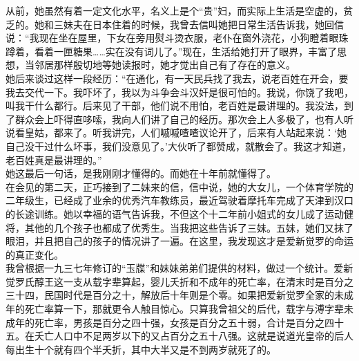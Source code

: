 从前，她虽然有着一定文化水平，名义上是个“贵”妇，而实际上生活是空虚的，贫乏的。她和三妹夫在日本住着的时候，我曾去信叫她把日常生活告诉我，她回信说：“我现在坐在屋里，下女在旁用熨斗烫衣服，老仆在窗外浇花，小狗瞪着眼珠蹲着，看着一匣糖果……实在没有词儿了。”现在，生活给她打开了眼界，丰富了思想，当邻居那样殷切地等她读报时，她才觉出自己有了存在的意义。\\

她后来谈过这样一段经历：“在通化，有一天民兵找了我去，说老百姓在开会，要我去交代一下。我吓坏了，我以为斗争会斗汉奸是很可怕的。我说，你饶了我吧，叫我干什么都行。后来见了干部，他们说不用怕，老百姓是最讲理的。我没法，到了群众会上吓得直哆嗦，我向人们讲了自己的经历。那次会上人多极了，也有人听说看皇姑，都来了。听我讲完，人们嘁嘁喳喳议论开了，后来有人站起来说：‘她自己没干过什么坏事，我们没意见了。’大伙听了都赞成，就散会了。我这才知道，老百姓真是最讲理的。”\\

她这最后一句话，是我刚刚才懂得的。而她在十年前就懂得了。\\

在会见的第二天，正巧接到了二妹来的信，信中说，她的大女儿，一个体育学院的二年级生，已经成了业余的优秀汽车教练员，最近驾驶着摩托车完成了天津到汉口的长途训练。她以幸福的语气告诉我，不但这个十二年前小姐式的女儿成了运动健将，其他的几个孩子也都成了优秀生。当我把这些告诉了三妹。五妹，她们又抹了眼泪，并且把自己的孩子的情况讲了一遍。在这里，我发现这才是爱新觉罗的命运的真正变化。\\

我曾根据一九三七年修订的“玉牒”和妹妹弟弟们提供的材料，做过一个统计。爱新觉罗氏醇王这一支从载字辈算起，婴儿夭折和不成年的死亡率，在清末时是百分之三十四，民国时代是百分之十，解放后十年则是个零。如果把爱新觉罗全家的未成年的死亡率算一下，那就更令人触目惊心。只算我曾祖父的后代，载字与溥字辈未成年的死亡率，男孩是百分之四十强，女孩是百分之五十弱，合计是百分之四十五。在夭亡人口中不足两岁以下的又占百分之五十八强。这就是说道光皇帝的后人每出生十个就有四个半夭折，其中大半又是不到两岁就死了的。\\

